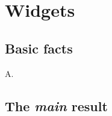 \chapter{Widgets}
\section{Basic facts}
\begin{lemma}\label{s1}A.\end{lemma}
\section{The \emph{main} result}

